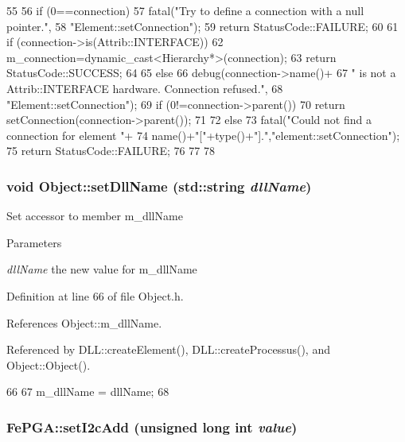 \begin{DoxyCode}
55                                                       {
56   if (0==connection){
57     fatal("Try to define a connection with a null pointer.",
58         "Element::setConnection");
59     return StatusCode::FAILURE;
60   }
61   if (connection->is(Attrib::INTERFACE)){
62     m_connection=dynamic_cast<Hierarchy*>(connection);
63     return StatusCode::SUCCESS;
64   }
65   else {
66     debug(connection->name()+
67         " is not a Attrib::INTERFACE hardware. Connection refused.",
68         "Element::setConnection");
69     if (0!=connection->parent()){
70       return setConnection(connection->parent());
71     }
72     else{
73       fatal("Could not find a connection for element "+
74           name()+"["+type()+"].","element::setConnection");
75       return StatusCode::FAILURE;
76     }
77   }
78 }
\end{DoxyCode}
\hypertarget{classObject_a870c5af919958c2136623b2d7816d123}{
\subsubsection[{setDllName}]{\setlength{\rightskip}{0pt plus 5cm}void Object::setDllName (std::string {\em dllName})}}
\label{classObject_a870c5af919958c2136623b2d7816d123}
Set accessor to member m\_\-dllName 
\begin{DoxyParams}{Parameters}
\item[{\em dllName}]the new value for m\_\-dllName \end{DoxyParams}


Definition at line 66 of file Object.h.

References Object::m\_\-dllName.

Referenced by DLL::createElement(), DLL::createProcessus(), and Object::Object().


\begin{DoxyCode}
66                                       {
67     m_dllName = dllName;
68   }
\end{DoxyCode}
\hypertarget{classFePGA_a2da860f836e04ecc54056d0bf8cc8f98}{
\subsubsection[{setI2cAdd}]{ FePGA::setI2cAdd (unsigned long int {\em value})}}
\label{classFePGA_a2da860f836e04ecc54056d0bf8cc8f98}


